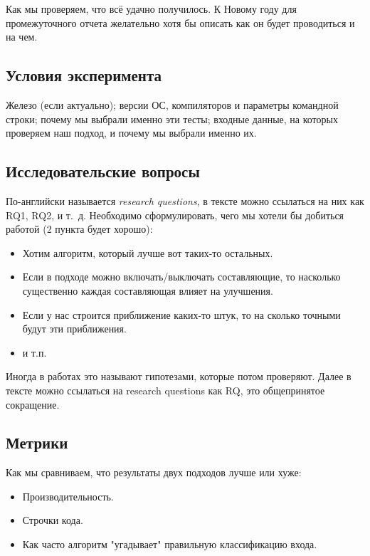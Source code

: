 
Как мы проверяем, что  всё удачно получилось.  К Новому году для промежуточного отчета желательно хотя бы описать как он будет проводиться и на чем.

\subsection{Условия эксперимента}
Железо (если актуально);  версии ОС, компиляторов и параметры командной строки; почему мы выбрали именно эти тесты; входные данные, на которых проверяем наш подход, и почему мы выбрали именно их.

\subsection{Исследовательские вопросы }
По-английски называется \emph{research questions}, в тексте можно ссылаться на них как RQ1, RQ2, и т.~д.
Необходимо сформулировать, чего мы хотели бы добиться работой (2 пункта будет хорошо):

\begin{itemize}
\item Хотим алгоритм, который лучше вот таких-то остальных.
\item Если в подходе можно включать/выключать составляющие, то насколько существенно каждая составляющая влияет на улучшения.
\item Если у нас строится приближение каких-то штук, то на сколько точными будут эти приближения.
\item и т.п.
\end{itemize}

Иногда в работах это называют гипотезами, которые потом проверяют. Далее в тексте можно ссылаться на research questions как \textsc{RQ}, это общепринятое сокращение.

\subsection{Метрики}

Как мы сравниваем, что результаты двух подходов лучше или хуже:
\begin{itemize}
\item Производительность.
\item Строчки кода.
\item Как часто алгоритм "угадывает" правильную классификацию входа.
\end{itemize}

